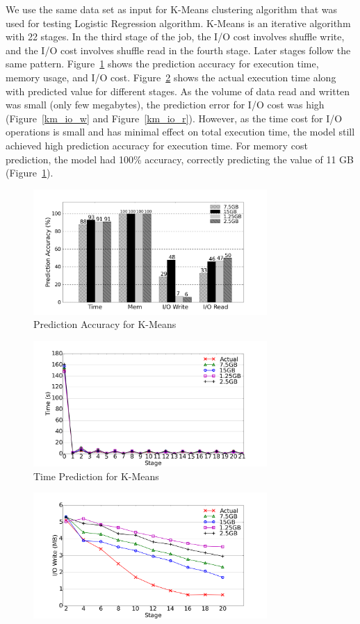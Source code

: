 {\noindent
We use the same data set as input for K-Means clustering algorithm that was used for testing Logistic Regression algorithm. K-Means is an iterative algorithm with 22 stages. In the third stage of the job, the I/O cost involves shuffle write, and the I/O cost involves shuffle read in the fourth stage. Later stages follow the same pattern. Figure~\ref{km_accuracy} shows the prediction accuracy for execution time, memory usage, and I/O cost. Figure~\ref{km_time} shows the actual execution time along with predicted value for different stages. 
As the volume of data read and written was small (only few megabytes), the prediction error for I/O cost was high (Figure~\ref{km_io_w} and Figure~\ref{km_io_r}). However, as the time cost for I/O operations is small and has minimal effect on total execution time, the model still achieved high prediction accuracy for execution time. For memory cost prediction, the model had 100\% accuracy, correctly predicting the value of 11 GB (Figure~\ref{km_accuracy}).
\begin{figure}[!t]
\centering
\includegraphics[width=3.5in]{figures/km_accuracy.png}
\caption{Prediction Accuracy for K-Means}
\label{km_accuracy}
\end{figure}
\begin{figure}[!t]
\centering
\includegraphics[width=3.5in]{figures/km_time.png}
\caption{Time Prediction for K-Means}
\label{km_time}
\end{figure}
\begin{figure}[!t]
\centering
\includegraphics[width=3.5in]{figures/km_io_w.png}

\end{figure}}
